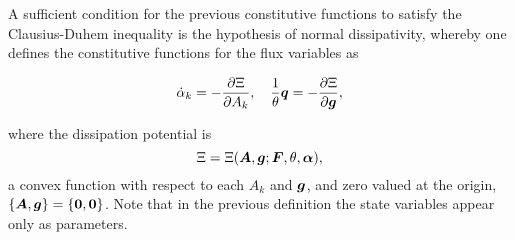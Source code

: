 A sufficient condition for the previous constitutive functions to satisfy the Clausius-Duhem inequality is the hypothesis of normal dissipativity, whereby one defines the constitutive functions for the flux variables as
\begin{highlight}
    \begin{equation}
        \dot \alpha_k = -\frac{\partial \Xi}{\partial A_k},\quad \frac{1}{\theta}\bm{q} = -\frac{\partial \Xi}{\partial \bm{g}},
    \end{equation}
\end{highlight}
where the dissipation potential is
\begin{equation}
    \Xi= \Xi(\bm{A}, \bm{g}; \bm{F}, \theta, \bm{\alpha}),
\end{equation}
a convex function with respect to each $A_k$ and $\bm{g}$, and zero valued at the origin, $\{\bm{A},\bm{g}\}=\{\bm{0},\bm{0}\}$.
Note that in the previous definition the state variables appear only as parameters.
